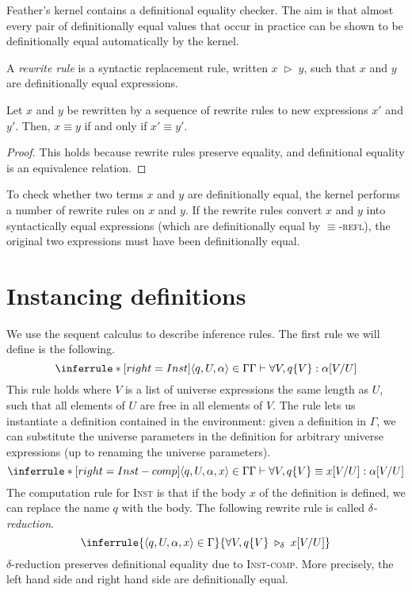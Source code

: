 Feather's kernel contains a definitional equality checker.
The aim is that almost every pair of definitionally equal values that occur in practice can be shown to be definitionally equal automatically by the kernel.
\begin{defn}
	A \textit{rewrite rule} is a syntactic replacement rule, written \( x \;\triangleright\; y \), such that \( x \) and \( y \) are definitionally equal expressions.
\end{defn}
\begin{lem}
	Let \( x \) and \( y \) be rewritten by a sequence of rewrite rules to new expressions \( x' \) and \( y' \).
	Then, \( x \equiv y \) if and only if \( x' \equiv y' \).
\end{lem}
\begin{proof}
	This holds because rewrite rules preserve equality, and definitional equality is an equivalence relation.
\end{proof}
To check whether two terms \( x \) and \( y \) are definitionally equal, the kernel performs a number of rewrite rules on \( x \) and \( y \).
If the rewrite rules convert \( x \) and \( y \) into syntactically equal expressions (which are definitionally equal by \( \equiv \)-\textsc{refl}), the original two expressions must have been definitionally equal.

\section{Instancing definitions}
We use the sequent calculus to describe inference rules.
The first rule we will define is the following.
\[ \inferrule*[right=Inst]
	{\langle q, U, \alpha \rangle \in \Gamma}
	{\Gamma \vdash \forall V, q\{V\} : \alpha[V/U]} \]
This rule holds where \( V \) is a list of universe expressions the same length as \( U \), such that all elements of \( U \) are free in all elements of \( V \).
The rule lets us instantiate a definition contained in the environment: given a definition in \( \Gamma \), we can substitute the universe parameters in the definition for arbitrary universe expressions (up to renaming the universe parameters).
\[ \inferrule*[right=Inst-comp]
	{\langle q, U, \alpha, x \rangle \in \Gamma}
	{\Gamma \vdash \forall V, q\{V\} \equiv x[V/U] : \alpha[V/U]} \]
The computation rule for \textsc{Inst} is that if the body \( x \) of the definition is defined, we can replace the name \( q \) with the body.
The following rewrite rule is called \textit{\( \delta \)-reduction}.
\[ \inferrule
	{\langle q, U, \alpha, x \rangle \in \Gamma}
	{\forall V, q\{V\} \;\triangleright_\delta\; x[V/U]} \]
\( \delta \)-reduction preserves definitional equality due to \textsc{Inst-comp}.
More precisely, the left hand side and right hand side are definitionally equal.

